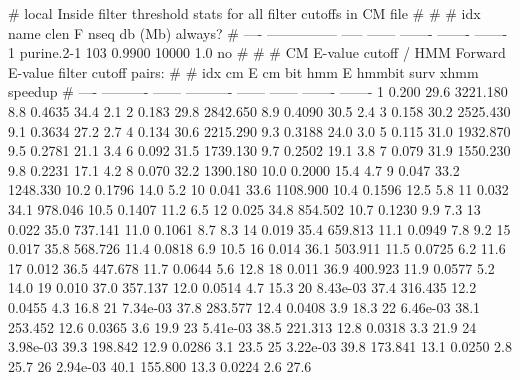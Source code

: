 \begin{sreoutput}
# local Inside filter threshold stats for all filter cutoffs in CM file
#
#
#  idx  name              clen       F     nseq  db (Mb)  always?
# ----  ---------------  -----  ------  -------  -------  -------
     1  purine.2-1         103  0.9900    10000      1.0       no
#
#
#       CM E-value cutoff / HMM Forward E-value filter cutoff pairs:
#
#       idx         cm E  cm bit       hmm E  hmmbit    surv     xhmm  speedup
#       ----  ----------  ------  ----------  ------  ------  -------  -------
           1       0.200    29.6    3221.180     8.8  0.4635     34.4      2.1
           2       0.183    29.8    2842.650     8.9  0.4090     30.5      2.4
           3       0.158    30.2    2525.430     9.1  0.3634     27.2      2.7
           4       0.134    30.6    2215.290     9.3  0.3188     24.0      3.0
           5       0.115    31.0    1932.870     9.5  0.2781     21.1      3.4
           6       0.092    31.5    1739.130     9.7  0.2502     19.1      3.8
           7       0.079    31.9    1550.230     9.8  0.2231     17.1      4.2
           8       0.070    32.2    1390.180    10.0  0.2000     15.4      4.7
           9       0.047    33.2    1248.330    10.2  0.1796     14.0      5.2
          10       0.041    33.6    1108.900    10.4  0.1596     12.5      5.8
          11       0.032    34.1     978.046    10.5  0.1407     11.2      6.5
          12       0.025    34.8     854.502    10.7  0.1230      9.9      7.3
          13       0.022    35.0     737.141    11.0  0.1061      8.7      8.3
          14       0.019    35.4     659.813    11.1  0.0949      7.8      9.2
          15       0.017    35.8     568.726    11.4  0.0818      6.9     10.5
          16       0.014    36.1     503.911    11.5  0.0725      6.2     11.6
          17       0.012    36.5     447.678    11.7  0.0644      5.6     12.8
          18       0.011    36.9     400.923    11.9  0.0577      5.2     14.0
          19       0.010    37.0     357.137    12.0  0.0514      4.7     15.3
          20    8.43e-03    37.4     316.435    12.2  0.0455      4.3     16.8
          21    7.34e-03    37.8     283.577    12.4  0.0408      3.9     18.3
          22    6.46e-03    38.1     253.452    12.6  0.0365      3.6     19.9
          23    5.41e-03    38.5     221.313    12.8  0.0318      3.3     21.9
          24    3.98e-03    39.3     198.842    12.9  0.0286      3.1     23.5
          25    3.22e-03    39.8     173.841    13.1  0.0250      2.8     25.7
          26    2.94e-03    40.1     155.800    13.3  0.0224      2.6     27.6

\end{sreoutput}
